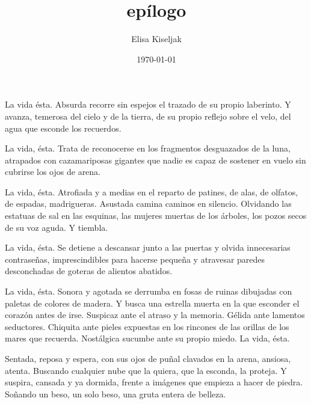 \documentclass[a5paper,doc,12pt,apacite]{apa6}
\title{epílogo}
\author{Elisa Kiseljak}
\date{\today}
\affiliation{Tres historias europeas}
\begin{document}
\maketitle


La vida ésta. Absurda recorre sin espejos el trazado de su propio laberinto. Y avanza, temerosa del cielo y de la tierra, de su propio reflejo sobre el velo, del agua que esconde los recuerdos.

La vida, ésta. Trata de reconocerse en los fragmentos desguazados de la luna, atrapados con cazamariposas gigantes que nadie es capaz de sostener en vuelo sin cubrirse los ojos de arena.

La vida, ésta. Atrofiada y a medias en el reparto de patines, de alas, de olfatos, de espadas, madrigueras. Asustada camina caminos en silencio. Olvidando las estatuas de sal en las esquinas, las mujeres muertas de los árboles, los pozos secos de su voz aguda. Y tiembla.

La vida, ésta. Se detiene a descansar junto a las puertas y olvida innecesarias contraseñas, imprescindibles para hacerse pequeña y atravesar paredes desconchadas de goteras de alientos abatidos.

La vida, ésta. Sonora y agotada se derrumba en fosas de ruinas dibujadas con paletas de colores de madera. Y busca una estrella muerta en la que esconder el corazón antes de irse. Suspicaz ante el atraso y la memoria. Gélida ante lamentos seductores. Chiquita ante pieles expuestas en los rincones de las orillas de los mares que recuerda. Nostálgica sucumbe ante su propio miedo. La vida, ésta.

Sentada, reposa y espera, con sus ojos de puñal clavados en la arena, ansiosa, atenta. Buscando cualquier nube que la quiera, que la esconda, la proteja. Y suspira, cansada y ya dormida, frente a imágenes que empieza a hacer de piedra. Soñando un beso, un solo beso, una gruta entera de belleza.


 

\end{document}
